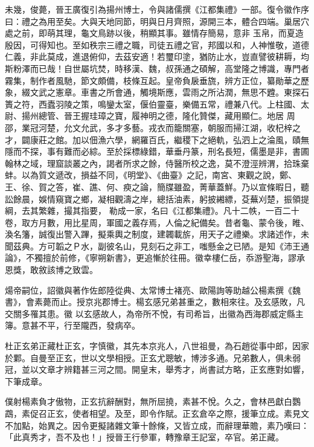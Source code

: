 \begin{pinyinscope}
 未幾，俊薨，晉王廣復引為揚州博士，令與諸儒撰《江都集禮》一部。復令徽作序曰：禮之為用至矣。大與天地同節，明與日月齊照，源開三本，體合四端。巢居穴處之前，即萌其理，龜文鳥跡以後，稍顯其事。雖情存簡易，意非
 玉帛，而夏造殷因，可得知也。至如秩宗三禮之職，司徒五禮之官，邦國以和，人神惟敬，道德仁義，非此莫成，進退俯仰，去茲安適！若璽印塗，猶防止水，豈直譬彼耕耨，均斯粉澤而已哉！自世屬坑焚，時移漢、魏，叔孫通之碩解，高堂隆之博識，專門者霧集，制作者風馳，節文頗備，枝條互起。皇帝負扆垂旒，辨方正位，纂勛華之歷象，綴文武之憲章。車書之所會通，觸境斯應，雲雨之所沾潤，無思不韙。東探石簣之符，西蠹羽陵之策，鳴鑾太室，偃伯靈臺，樂備五常，禮兼八代。上柱國、太尉、揚州總管、晉王握珪璋之寶，履神明之德，隆化贊傑，藏用顯仁。地居
 周邵，業冠河楚，允文允武，多才多藝。戎衣而籠關塞，朝服而掃江湖，收杞梓之才，闢康莊之館。加以佃漁六學，網羅百氏，繼稷下之絕軌，弘泗上之淪風，賾無隱而不探，事有難而必綜。至於採標綠錯，華垂丹篆，刑名長短，儒墨是非，書圃翰林之域，理窟談叢之內，謁者所求之餘，侍醫所校之逸，莫不澄涇辨渭，拾珠棄蚌。以為質文遞改，損益不同，《明堂》、《曲臺》之記，南宮、東觀之說，鄭、王、徐、賀之答，崔、譙、何、瘐之論，簡牒雖盈，菁華蓋鮮。乃以宣條暇日，聽訟餘晨，娛情窺寶之鄉，凝相觀濤之岸，總括油素，躬披緗縹，芟蕪刈楚，振領提綱，去其繁雜，撮其指要，
 勒成一家，名曰《江都集禮》。凡十二帙，一百二十卷，取方月數，用比星周，軍國之義存焉，人倫之紀備矣。昔者龜、蒙令後，睢、渙名籓，誠復出警入蹕，擬乘輿之制度，建韣載旂，用天子之禮樂。求諸述作，未聞茲典。方可韜之Ｐ水，副彼名山，見刻石之非工，嗤懸金之已陋。是知《沛王通論》，不獨擅於前修，《寧朔新書》，更追慚於往冊。徽幸樓仁岳，忝游聖海，謬承恩獎，敢敘該博之致雲。



 煬帝嗣位，詔徽與著作佐郎陸從典、太常博士褚亮、歐陽詢等助越公楊素撰《魏書》，會素薨而止。授京兆郡博士。楊玄感兄弟甚重之，數相來往。及玄感敗，凡交關多罹其患。徽
 以玄感故人，為帝所不悅，有司希旨，出徽為西海郡威定縣主簿。意甚不平，行至隴西，發病卒。



 杜正玄弟正藏杜正玄，字慎徽，其先本京兆人，八世祖曼，為石趙從事中郎，因家於鄴。自曼至正玄，世以文學相授。正玄尤聰敏，博涉多通。兄弟數人，俱未弱冠，並以文章才辨籍甚三河之間。開皇末，舉秀才，尚書試方略，正玄應對如響，下筆成章。



 僕射楊素負才傲物，正玄抗辭酬對，無所屈撓，素甚不悅。久之，會林邑獻白鸚鵡，素促召正玄，使者相望。及至，即令作賦。正玄倉卒之際，援筆立成。素見文
 不加點，始異之。因令更擬諸雜文筆十餘條，又皆立成，而辭理華贍，素乃嘆曰：「此真秀才，吾不及也！」授晉王行參軍，轉豫章王記室，卒官。弟正藏。




\end{pinyinscope}
